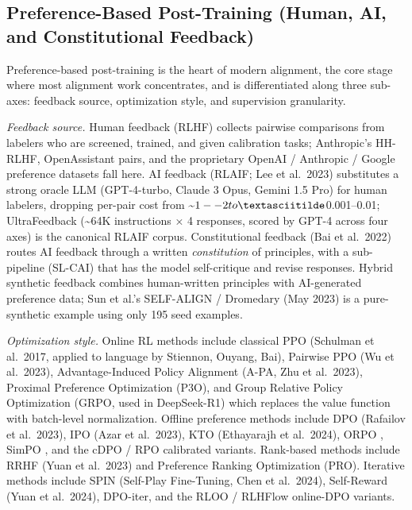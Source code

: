 \documentclass{article}
\begin{document}
\subsection{Preference-Based Post-Training (Human, AI, and Constitutional Feedback)}\label{preference-based-post-training-human-ai-and-constitutional-feedback}

Preference-based post-training is the heart of modern alignment, the core stage where most alignment work concentrates, and is differentiated along three sub-axes: feedback source, optimization style, and supervision granularity.

\emph{Feedback source.} Human feedback (RLHF) collects pairwise comparisons from labelers who are screened, trained, and given calibration tasks; Anthropic's HH-RLHF, OpenAssistant pairs, and the proprietary OpenAI / Anthropic / Google preference datasets fall here. AI feedback (RLAIF; Lee et al.~2023) substitutes a strong oracle LLM (GPT-4-turbo, Claude 3 Opus, Gemini 1.5 Pro) for human labelers, dropping per-pair cost from \textasciitilde$1--2 to \textasciitilde$0.001--0.01; UltraFeedback (\textasciitilde64K instructions × 4 responses, scored by GPT-4 across four axes) is the canonical RLAIF corpus. Constitutional feedback (Bai et al.~2022) routes AI feedback through a written \emph{constitution} of principles, with a sub-pipeline (SL-CAI) that has the model self-critique and revise responses. Hybrid synthetic feedback combines human-written principles with AI-generated preference data; Sun et al.'s SELF-ALIGN / Dromedary (May 2023) is a pure-synthetic example using only 195 seed examples.

\emph{Optimization style.} Online RL methods include classical PPO (Schulman et al.~2017, applied to language by Stiennon, Ouyang, Bai), Pairwise PPO (Wu et al.~2023), Advantage-Induced Policy Alignment (A-PA, Zhu et al.~2023), Proximal Preference Optimization (P3O), and Group Relative Policy Optimization (GRPO, used in DeepSeek-R1) which replaces the value function with batch-level normalization. Offline preference methods include DPO (Rafailov et al.~2023), IPO (Azar et al.~2023), KTO (Ethayarajh et al.~2024), ORPO \citep{hong2024orpomonolithicpref}, SimPO \citep{meng2024simposimpleprefere}, and the cDPO / RPO calibrated variants. Rank-based methods include RRHF (Yuan et al.~2023) and Preference Ranking Optimization (PRO). Iterative methods include SPIN (Self-Play Fine-Tuning, Chen et al.~2024), Self-Reward (Yuan et al.~2024), DPO-iter, and the RLOO / RLHFlow online-DPO variants.
\end{document}
